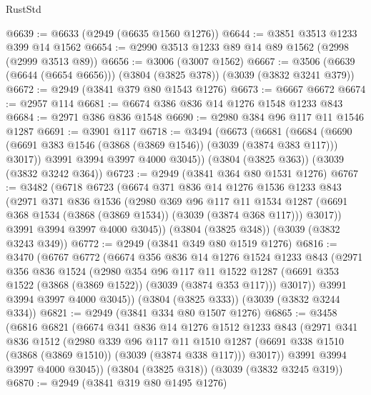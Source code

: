 \begin{lexlean}{RustStd}
\begin{coremodule}
@6639 := @6633 (@2949 (@6635 @1560 @1276))
@6644 := @3851 @3513 @1233 @399 @14 @1562
@6654 := @2990 @3513 @1233 @89 @14 @89 @1562 (@2998 (@2999 @3513 @89))
@6656 := @3006 (@3007 @1562)
@6667 := @3506 (@6639 (@6644 (@6654 @6656))) (@3804 (@3825 @378)) (@3039 (@3832 @3241 @379))
@6672 := @2949 (@3841 @379 @80 @1543 @1276)
@6673 := @6667 @6672
@6674 := @2957 @114
@6681 := @6674 @386 @836 @14 @1276 @1548 @1233 @843
@6684 := @2971 @386 @836 @1548
@6690 := @2980 @384 @96 @117 @11 @1546 @1287
@6691 := @3901 @117
@6718 := @3494
    (@6673
      (@6681
        (@6684 (@6690 (@6691 @383 @1546 (@3868 (@3869 @1546)) (@3039 (@3874 @383 @117))) @3017))
        @3991
        @3994
        @3997
        @4000
        @3045))
    (@3804 (@3825 @363))
    (@3039 (@3832 @3242 @364))
@6723 := @2949 (@3841 @364 @80 @1531 @1276)
@6767 := @3482
    (@6718
      @6723
      (@6674
        @371
        @836
        @14
        @1276
        @1536
        @1233
        @843
        (@2971
          @371
          @836
          @1536
          (@2980
            @369
            @96
            @117
            @11
            @1534
            @1287
            (@6691 @368 @1534 (@3868 (@3869 @1534)) (@3039 (@3874 @368 @117)))
            @3017))
        @3991
        @3994
        @3997
        @4000
        @3045))
    (@3804 (@3825 @348))
    (@3039 (@3832 @3243 @349))
@6772 := @2949 (@3841 @349 @80 @1519 @1276)
@6816 := @3470
    (@6767
      @6772
      (@6674
        @356
        @836
        @14
        @1276
        @1524
        @1233
        @843
        (@2971
          @356
          @836
          @1524
          (@2980
            @354
            @96
            @117
            @11
            @1522
            @1287
            (@6691 @353 @1522 (@3868 (@3869 @1522)) (@3039 (@3874 @353 @117)))
            @3017))
        @3991
        @3994
        @3997
        @4000
        @3045))
    (@3804 (@3825 @333))
    (@3039 (@3832 @3244 @334))
@6821 := @2949 (@3841 @334 @80 @1507 @1276)
@6865 := @3458
    (@6816
      @6821
      (@6674
        @341
        @836
        @14
        @1276
        @1512
        @1233
        @843
        (@2971
          @341
          @836
          @1512
          (@2980
            @339
            @96
            @117
            @11
            @1510
            @1287
            (@6691 @338 @1510 (@3868 (@3869 @1510)) (@3039 (@3874 @338 @117)))
            @3017))
        @3991
        @3994
        @3997
        @4000
        @3045))
    (@3804 (@3825 @318))
    (@3039 (@3832 @3245 @319))
@6870 := @2949 (@3841 @319 @80 @1495 @1276)

\end{coremodule}
\end{lexlean}
